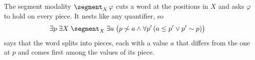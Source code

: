 The segment modality $\segment_X\, \varphi$ cuts a word at the positions in
$X$ and asks $\varphi$ to hold on every piece. It nests like any
quantifier, so
\[
  \exists p\; \exists X\; \segment_X\; \exists a\;
  \bigl(p \not\sim a \land \forall p'\,(a \le p' \lor p' \sim p)\bigr)
\]
says that the word splits into pieces, each with a value $a$ that differs
from the one at $p$ and comes first among the values of its piece.
